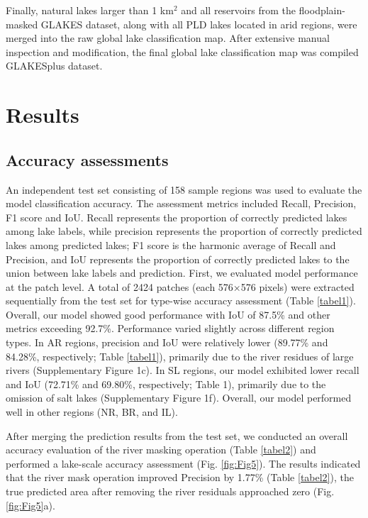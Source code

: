 \documentclass[preprint,12pt,authoryear]{elsarticle}
\begin{document}
Finally, natural lakes larger than 1 km$^2$ and all reservoirs from the floodplain-masked GLAKES dataset, along with all PLD lakes located in arid regions, were merged into the raw global lake classification map. After extensive manual inspection and modification, the final global lake classification map was compiled GLAKESplus dataset.

\section{Results}
\label{sec3}

\subsection{Accuracy assessments}
\label{subsec31}

An independent test set consisting of 158 sample regions was used to evaluate the model classification accuracy. The assessment metrics included Recall, Precision, F1 score and IoU. Recall represents the proportion of correctly predicted lakes among lake labels, while precision represents the proportion of correctly predicted lakes among predicted lakes; F1 score is the harmonic average of Recall and Precision, and IoU represents the proportion of correctly predicted lakes to the union between lake labels and prediction. First, we evaluated model performance at the patch level. A total of 2424 patches (each 576×576 pixels) were extracted sequentially from the test set for type-wise accuracy assessment (Table \ref{tabel1}). Overall, our model showed good performance with IoU of 87.5\% and other metrics exceeding 92.7\%. Performance varied slightly across different region types. In AR regions, precision and IoU were relatively lower (89.77\% and 84.28\%, respectively; Table \ref{tabel1}), primarily due to the river residues of large rivers (Supplementary Figure 1c). In SL regions, our model exhibited lower recall and IoU (72.71\% and 69.80\%, respectively; Table 1), primarily due to the omission of salt lakes (Supplementary Figure 1f). Overall, our model performed well in other regions (NR, BR, and IL). 

After merging the prediction results from the test set, we conducted an overall accuracy evaluation of the river masking operation (Table \ref{tabel2}) and performed a lake-scale accuracy assessment (Fig. \ref{fig:Fig5}). The results indicated that the river mask operation improved Precision by 1.77\% (Table \ref{tabel2}), the true predicted area after removing the river residuals approached zero (Fig. \ref{fig:Fig5}a). 
\end{document}
